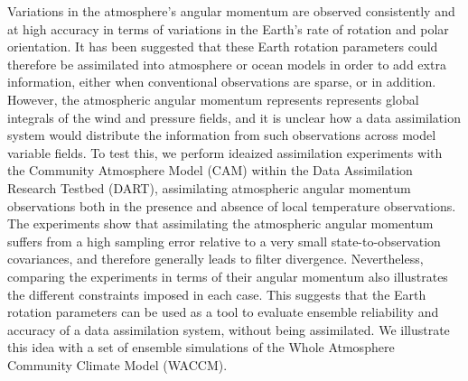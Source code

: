 Variations in the atmosphere's angular momentum are observed consistently and at high accuracy in terms of variations in the Earth's rate of rotation and polar orientation.
It has been suggested that these Earth rotation parameters could therefore be assimilated into atmosphere or ocean models in order to add extra information, either when conventional observations are sparse, or in addition.
%
However, the atmospheric angular momentum represents represents global integrals of the wind and pressure fields, and it is unclear how a data assimilation system would distribute the information from such observations across model variable fields.  
%
To test this, we perform ideaized assimilation experiments with the Community Atmosphere Model (CAM) within the Data Assimilation Research Testbed (DART), assimilating atmospheric angular momentum observations both in the presence and absence of local temperature observations. 
The experiments show that
assimilating the atmospheric angular momentum suffers from a high sampling error relative to a very small state-to-observation covariances, and therefore
generally leads to filter divergence.
Nevertheless, comparing the experiments in terms of their angular momentum also illustrates the different constraints imposed in each case. 
This suggests that the Earth rotation parameters can be used as a tool to evaluate ensemble reliability and accuracy of a data assimilation system, without being assimilated. 
We illustrate this idea with a set of ensemble simulations of the Whole Atmosphere Community Climate Model (WACCM).
